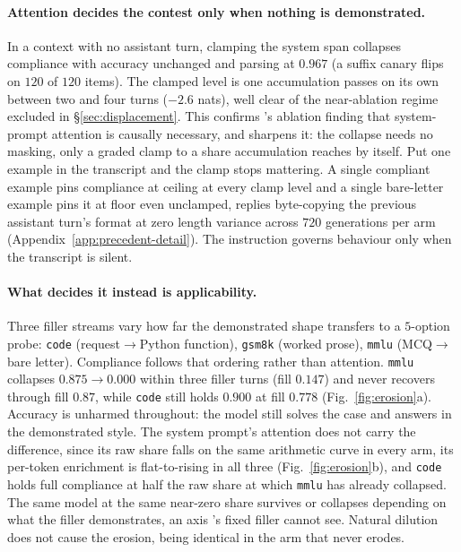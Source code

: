 \documentclass{article}
\begin{document}
\paragraph{Attention decides the contest only when nothing is demonstrated.}
In a context with no assistant turn, clamping the system span collapses compliance with
accuracy unchanged and parsing at $0.967$ (a suffix canary flips on $120$ of $120$ items). The
clamped level is one accumulation passes on its own between two and four turns ($-2.6$ nats),
well clear of the near-ablation regime excluded in \S\ref{sec:displacement}. This confirms
\citet{dongre2026attentioncloses}'s ablation finding that system-prompt attention is causally
necessary, and sharpens it: the collapse needs no masking, only a graded clamp to a share
accumulation reaches by itself. Put one example in the transcript and the clamp stops
mattering. A single compliant example pins compliance at ceiling at every clamp level and a
single bare-letter example pins it at floor even unclamped, replies byte-copying the previous
assistant turn's format at zero length variance across $720$ generations per arm
(Appendix~\ref{app:precedent-detail}). The instruction governs behaviour only when the
transcript is silent.

\paragraph{What decides it instead is applicability.}
Three filler streams vary how far the demonstrated shape transfers to a $5$-option probe:
\texttt{code} (request$\to$Python function), \texttt{gsm8k} (worked prose), \texttt{mmlu}
(MCQ$\to$bare letter). Compliance follows that ordering rather than attention. \texttt{mmlu}
collapses $0.875\to0.000$ within three filler turns (fill $0.147$) and never recovers through
fill $0.87$, while \texttt{code} still holds $0.900$ at fill $0.778$
(Fig.~\ref{fig:erosion}a). Accuracy is unharmed throughout: the model still solves the case
and answers in the demonstrated style. The system prompt's attention does not carry the
difference, since its raw share falls on the same arithmetic curve in every arm, its per-token
enrichment is flat-to-rising in all three (Fig.~\ref{fig:erosion}b), and \texttt{code} holds
full compliance at half the raw share at which \texttt{mmlu} has already collapsed. The same model at the same near-zero share survives or collapses depending on what the filler
demonstrates, an axis \citet{dongre2026attentioncloses}'s fixed filler cannot see. Natural
dilution does not cause the erosion, being identical in the arm that never erodes.
\end{document}
